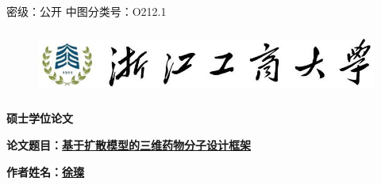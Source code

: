 \documentclass[a4paper,12pt,openany,oneside,utf-8]{ctexbook}
\newcommand{\chuhao}{\fontsize{48pt}{\baselineskip}\selectfont}
\newcommand{\sanhao}{\fontsize{15.75pt}{\baselineskip}\selectfont}
\newcommand{\xiaowuhao}{\fontsize{9pt}{\baselineskip}\selectfont}
\begin{document}
\theoremstyle{plain} \theoremseparator{}
 \theoremsymbol{}%



\fancypagestyle{plain}{%
\fancyhead{} 
\fancyhead[CE,CO]{\xiaowuhao{}}} 
\begin{titlepage}
\fancyhead[C]{\xiaowuhao} %
\vskip 4mm
\xiaowuhao 密级：公开 \hspace{9cm}中图分类号：O212.1

\vskip 6mm

\begin{figure}[htbp]
\centering
\includegraphics[width=140mm,height=22mm]{figures/zjgsu.jpg}
\end{figure}

\vskip 10mm

\begin{spacing}{1.0}
\begin{center}
\chuhao\textbf{硕士学位论文}
\end{center}

\vskip 20mm
\begin{center}
\hspace{0.01mm}\sanhao\textbf{论文题目：\underline{基于扩散模型的三维药物分子设计框架}}
\end{center}
\end{spacing}
\vspace{24mm}

\begin{center}
\textbf{\kaishu\sanhao 作者姓名：\underline{\quad \quad \quad \quad  徐璨 \quad \quad \quad \quad}}
\end{center}



\end{titlepage}
\end{document}
